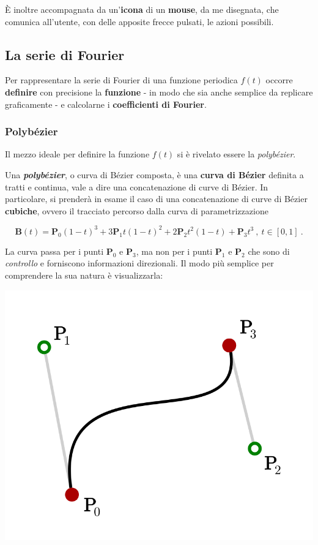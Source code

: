 \documentclass[
]{book}
\begin{document}
È inoltre accompagnata da un'\textbf{icona} di un \textbf{mouse}, da me disegnata, che comunica all'utente, con delle apposite frecce pulsati, le azioni possibili.

\hypertarget{anserie}{%
\subsection{La serie di Fourier}\label{anserie}}

Per rappresentare la serie di Fourier di una funzione periodica \(f(t)\) occorre \textbf{definire} con precisione la \textbf{funzione} - in modo che sia anche semplice da replicare graficamente - e calcolarne i \textbf{coefficienti di Fourier}.

\hypertarget{polbezier}{%
\subsubsection{Polybézier}\label{polbezier}}

Il mezzo ideale per definire la funzione \(f(t)\) si è rivelato essere la \emph{polybézier}.

Una \textbf{\emph{polybézier}}, o curva di Bézier composta, è una \textbf{curva di Bézier} definita a tratti e continua, vale a dire una concatenazione di curve di Bézier. In particolare, si prenderà in esame il caso di una concatenazione di curve di Bézier \textbf{cubiche}, ovvero il tracciato percorso dalla curva di parametrizzazione

\begin{equation}
    \mathbf{B}(t)=\mathbf{P}_0(1-t)^3+3\mathbf{P}_1t(1-t)^2+2\mathbf{P}_2t^2(1-t)+\mathbf{P}_3t^3 \ , \ t \in [0,1] \ .
    \label{eq:bezier}
\end{equation}

La curva passa per i punti \(\mathbf{P}_0\) e \(\mathbf{P}_3\), ma non per i punti \(\mathbf{P}_1\) e \(\mathbf{P}_2\) che sono di \emph{controllo} e forniscono informazioni direzionali. Il modo più semplice per comprendere la sua natura è visualizzarla:

\begin{center}\includegraphics[width=0.36\linewidth]{_images/bezier} \end{center}
\end{document}
